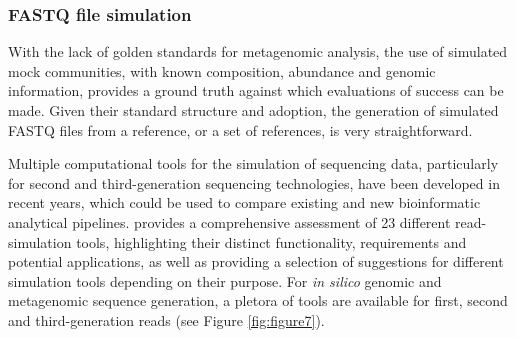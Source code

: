 \subsubsection{FASTQ file simulation} \label{ssec:_intro_fastq_sim}

With the lack of golden standards for metagenomic analysis, the use of simulated mock communities, with known composition, abundance and genomic information, provides a ground truth against which evaluations of success can be made. Given their standard structure and adoption, the generation of simulated FASTQ files from a reference, or a set of references, is very straightforward. 

Multiple computational tools for the simulation of sequencing data, particularly for second and third-generation sequencing technologies, have been developed in recent years, which could be used to compare existing and new bioinformatic analytical pipelines. \cite{escalona_comparison_2016} provides a comprehensive assessment of 23 different read-simulation tools,  highlighting their distinct functionality, requirements and potential applications, as well as providing a selection of suggestions for different simulation tools depending on their purpose. For \textit{in silico} genomic and metagenomic sequence generation, a pletora of tools are available for first, second and third-generation reads (see Figure \ref{fig:figure7}).

